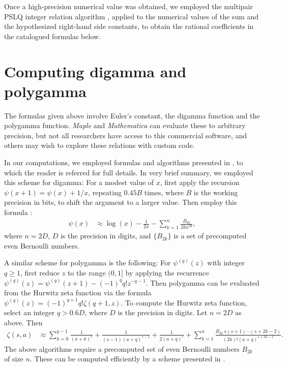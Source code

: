 \documentclass{article}
\theoremstyle{definition}
\begin{document}
Once a high-precision numerical value was obtained, we employed the multipair PSLQ integer relation algorithm \cite{Bailey2000}, applied to the numerical values of the sum and the hypothesized right-hand side constants, to obtain the rational coefficients in the catalogued formulas below.


\section{Computing digamma and polygamma} \label{sec:polygamma}

The formulas given above involve Euler's constant, the digamma function and the polygamma function. \emph{Maple} and \emph{Mathematica} can evaluate these to arbitrary precision, but not all researchers have access to this commercial software, and others may wish to explore these relations with custom code.

In our computations, we employed formulas and algorithms presented in \cite{mpfun2020}, to which the reader is referred for full details. In very brief summary, we employed this scheme for digamma: For a modest value of $x$, first apply the recursion $\psi(x+1) = \psi(x) + 1/x$, repeating $0.45B$ times, where $B$ is the working precision in bits, to shift the argument to a larger value. Then employ this formula \cite[5.11.2]{dlmf}:
\begin{align}
\psi(x) &\approx \log(x) - \frac{1}{2x} - \sum_{k=1}^n \frac{B_{2k}}{2k x^{2k}}, \label{form:digamma}
\end{align}
where $n = 2 D$, $D$ is the precision in digits, and $\{B_{2k}\}$ is a set of precomputed even Bernoulli numbers.

A similar scheme for polygamma is the following: For $\psi^{(q)}(z)$ with integer $q \geq 1$, first reduce $z$ to the range $(0,1]$ by applying the recurrence $\psi^{(q)}(z) = \psi^{(q)}(z+1) - (-1)^q q! z^{-q-1}$. Then polygamma can be evaluated from the Hurwitz zeta function via the formula \cite{wiki-polygamma} $\psi^{(q)}(z) = (-1)^{q+1} q! \zeta(q+1, z)$. To compute the Hurwitz zeta function, select an integer $q > 0.6D$, where $D$ is the precision in digits. Let $n = 2 D$ as above. Then
\begin{align}
\zeta(s,a) &\approx \sum_{k=0}^{q-1} \frac{1}{(a+k)^s} + \frac{1}{(s-1)(a+q)^{s-1}} + \frac{1}{2(a+q)^s} + \sum_{k=1}^n \frac{B_{2k} \, s (s+1) \cdots (s+2k-2)}{(2k)! (a+q)^{s+2k-1}}.
\end{align}
The above algorithms require a precomputed set of even Bernoulli numbers $B_{2k}$ of size $n$. These can be computed efficiently by a scheme presented in \cite{mpfun2020}.
\end{document}
